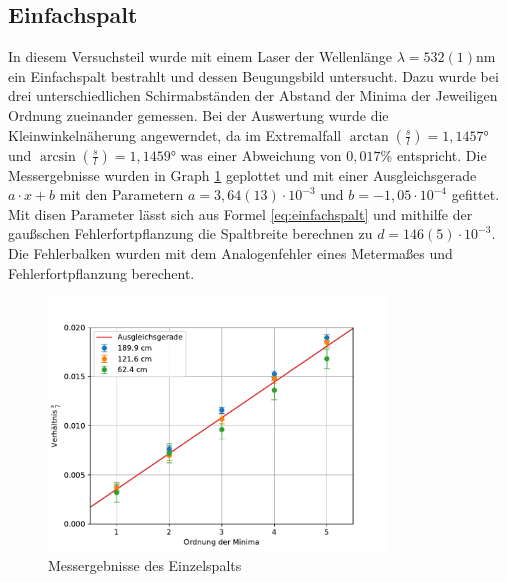 \documentclass[11pt, a4paper]{article}
\begin{document}
    \subsection{Einfachspalt}
    In diesem Versuchsteil wurde mit einem Laser der Wellenlänge $\lambda = 532(1)\si{\nano\meter}$ ein Einfachspalt bestrahlt und dessen Beugungsbild untersucht.
    Dazu wurde bei drei unterschiedlichen Schirmabständen der Abstand der Minima der Jeweiligen Ordnung zueinander gemessen. Bei der Auswertung wurde die Kleinwinkelnäherung angewerndet, da im Extremalfall $\arctan(\frac{s}{l}) = 1,1457°$ und $\arcsin(\frac{s}{l}) = 1,1459°$
    was einer Abweichung von $0,017\percent$ entspricht. Die Messergebnisse wurden in Graph \ref{fig:einzelspalt} geplottet und mit einer Ausgleichsgerade $a \cdot x + b$ mit den Parametern $a = 3,64(13) \cdot 10^{-3}$ und $b= -1,05 \cdot 10^{-4}$ gefittet.
    Mit disen Parameter lässt sich aus Formel \ref{eq:einfachspalt} und mithilfe der gaußschen Fehlerfortpflanzung die Spaltbreite berechnen zu $d= 146(5) \cdot 10^{-3}$. Die Fehlerbalken wurden mit dem Analogenfehler eines Metermaßes und Fehlerfortpflanzung berechent.
    


    \begin{figure}
        \centering
        \includegraphics[width=0.8\textwidth]{./plots/einzelspalt.pdf}
        \caption{Messergebnisse des Einzelspalts}
        \label{fig:einzelspalt}
    \end{figure}
\end{document}

